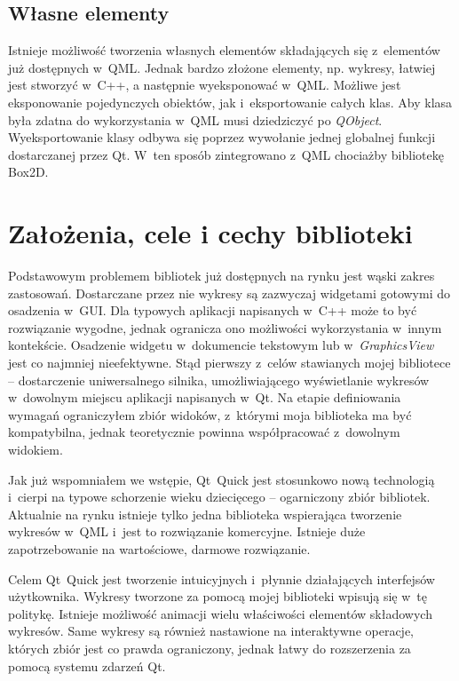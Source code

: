 \subsection{Własne elementy}
Istnieje możliwość tworzenia własnych elementów składających się z~elementów już dostępnych w~QML. Jednak bardzo złożone elementy, np. wykresy, łatwiej jest stworzyć w~C++, a następnie wyeksponować w~QML. Możliwe jest eksponowanie pojedynczych obiektów, jak i~eksportowanie całych klas. Aby klasa była zdatna do wykorzystania w~QML musi dziedziczyć po \textit{QObject}. Wyeksportowanie klasy odbywa się poprzez wywołanie jednej globalnej funkcji dostarczanej przez Qt. W~ten sposób zintegrowano z~QML chociażby bibliotekę Box2D.

\section{Założenia, cele i cechy biblioteki}
Podstawowym problemem bibliotek już dostępnych na rynku jest wąski zakres zastosowań. Dostarczane przez nie wykresy są zazwyczaj widgetami gotowymi do osadzenia w~GUI. Dla typowych aplikacji napisanych w~C++ może to być rozwiązanie wygodne, jednak ogranicza ono możliwości wykorzystania w~innym kontekście. Osadzenie widgetu w~dokumencie tekstowym lub w~\textit{GraphicsView} jest co najmniej nieefektywne. Stąd pierwszy z~celów stawianych mojej bibliotece -- dostarczenie uniwersalnego silnika, umożliwiającego wyświetlanie wykresów w~dowolnym miejscu aplikacji napisanych w~Qt. Na etapie definiowania wymagań ograniczyłem zbiór widoków, z~którymi moja biblioteka ma być kompatybilna, jednak teoretycznie powinna współpracować z~dowolnym widokiem.

Jak już wspomniałem we wstępie, Qt~Quick jest stosunkowo nową technologią i~cierpi na typowe schorzenie wieku dziecięcego -- ogarniczony zbiór bibliotek. Aktualnie na rynku istnieje tylko jedna biblioteka wspierająca tworzenie wykresów w~QML i~jest to rozwiązanie komercyjne. Istnieje duże zapotrzebowanie na wartościowe, darmowe rozwiązanie.

Celem Qt~Quick jest tworzenie intuicyjnych i~płynnie działających interfejsów użytkownika. Wykresy tworzone za pomocą mojej biblioteki wpisują się w~tę politykę. Istnieje możliwość animacji wielu właściwości elementów składowych wykresów. Same wykresy są również nastawione na interaktywne operacje, których zbiór jest co prawda ograniczony, jednak łatwy do rozszerzenia za pomocą systemu zdarzeń Qt.

